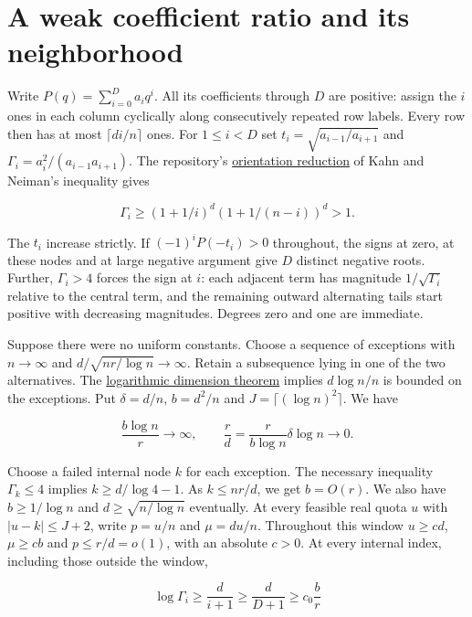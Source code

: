 \documentclass[11pt]{article}
\begin{document}
\section{A weak coefficient ratio and its neighborhood}

Write $P(q)=\sum_{i=0}^D a_iq^i$. All its coefficients through $D$ are positive: assign the $i$ ones in each column cyclically along consecutively repeated row labels. Every row then has at most $\lceil di/n\rceil$ ones. For $1\le i<D$ set $t_i=\sqrt{a_{i-1}/a_{i+1}}$ and $\Gamma_i=a_i^2/(a_{i-1}a_{i+1})$. The repository's \href{https://github.com/ProgramComputer/open-math-research/blob/main/topics/balanced-arrays/orientation-normalization.md}{orientation reduction} of Kahn and Neiman's inequality \cite{KN} gives

\[
\Gamma_i\ge (1+1/i)^d(1+1/(n-i))^d>1.
\]

The $t_i$ increase strictly. If $(-1)^iP(-t_i)>0$ throughout, the signs at zero, at these nodes and at large negative argument give $D$ distinct negative roots. Further, $\Gamma_i>4$ forces the sign at $i$: each adjacent term has magnitude $1/\sqrt{\Gamma_i}$ relative to the central term, and the remaining outward alternating tails start positive with decreasing magnitudes. Degrees zero and one are immediate.

Suppose there were no uniform constants. Choose a sequence of exceptions with $n\to\infty$ and $d/\sqrt{nr/\log n}\to\infty$. Retain a subsequence lying in one of the two alternatives. The \href{https://github.com/ProgramComputer/open-math-research/blob/main/topics/balanced-arrays/dense-regime/logarithmic-window.md}{logarithmic dimension theorem} implies $d\log n/n$ is bounded on the exceptions. Put $\delta=d/n$, $b=d^2/n$ and $J=\lceil(\log n)^2\rceil$. We have

\[
\frac{b\log n}{r}\longrightarrow\infty,\qquad
\frac rd=\frac{r}{b\log n}\delta\log n\longrightarrow0.
\]

Choose a failed internal node $k$ for each exception. The necessary inequality $\Gamma_k\le4$ implies $k\ge d/\log4-1$. As $k\le nr/d$, we get $b=O(r)$. We also have $b\ge1/\log n$ and $d\ge\sqrt{n/\log n}$ eventually. At every feasible real quota $u$ with $|u-k|\le J+2$, write $p=u/n$ and $\mu=du/n$. Throughout this window $u\ge c d$, $\mu\ge cb$ and $p\le r/d=o(1)$, with an absolute $c>0$. At every internal index, including those outside the window,

\[
\log\Gamma_i\ge \frac{d}{i+1}\ge\frac{d}{D+1}\ge c_0\frac br
\]
\end{document}
